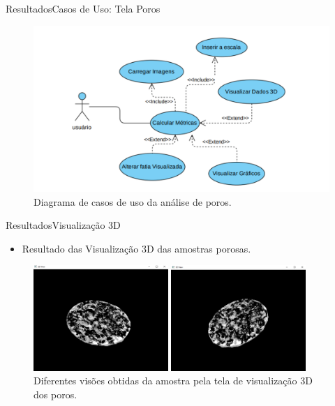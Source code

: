 \documentclass{beamer}
\begin{document}
\begin{frame}{Resultados}{Casos de Uso: Tela Poros}
    \begin{figure}[!htb]
    \centering
    \includegraphics[width=12.0cm]{fig/casos-3.pdf}\\
    \scriptsize{Diagrama de casos de uso da análise de poros.}
    \end{figure}
\end{frame}
\begin{frame}{Resultados}{Visualização 3D}
    
    \begin{itemize}
        \item Resultado das Visualização 3D das amostras porosas.
    \end{itemize}
          
    \begin{figure}[!htb]
    \centering
    \includegraphics[height=4cm]{fig/3dview-2.png} \hspace*{0.1cm}
    \includegraphics[height=4cm]{fig/3dview-1.png}\\
    \scriptsize{Diferentes visões obtidas da amostra pela tela de visualização 3D dos poros.}
    \end{figure}
\end{frame}
\end{document}
